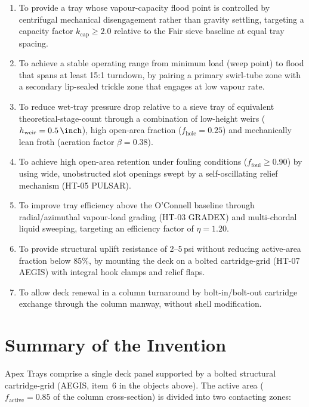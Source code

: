 \documentclass[11pt,letterpaper]{article}
\begin{document}
\begin{enumerate}[nosep]
  \item To provide a tray whose vapour-capacity flood point is controlled by
    centrifugal mechanical disengagement rather than gravity settling, targeting
    a capacity factor $k_{\mathrm{cap}}\geq 2.0$ relative to the Fair sieve
    baseline at equal tray spacing.
  \item To achieve a stable operating range from minimum load (weep point) to
    flood that spans at least 15:1 turndown, by pairing a primary swirl-tube
    zone with a secondary lip-sealed trickle zone that engages at low vapour
    rate.
  \item To reduce wet-tray pressure drop relative to a sieve tray of equivalent
    theoretical-stage-count through a combination of low-height weirs
    ($h_{\mathrm{weir}}=\SI{0.5}{\inch}$), high open-area fraction
    ($f_{\mathrm{hole}}=0.25$) and mechanically lean froth (aeration factor
    $\beta=0.38$).
  \item To achieve high open-area retention under fouling conditions
    ($f_{\mathrm{foul}}\geq 0.90$) by using wide, unobstructed slot openings
    swept by a self-oscillating relief mechanism (HT-05 PULSAR).
  \item To improve tray efficiency above the O'Connell baseline through
    radial/azimuthal vapour-load grading (HT-03 GRADEX) and multi-chordal
    liquid sweeping, targeting an efficiency factor of $\eta=1.20$.
  \item To provide structural uplift resistance of 2--5\,psi without
    reducing active-area fraction below 85\%, by mounting the deck on a
    bolted cartridge-grid (HT-07 AEGIS) with integral hook clamps and relief
    flaps.
  \item To allow deck renewal in a column turnaround by bolt-in/bolt-out
    cartridge exchange through the column manway, without shell modification.
\end{enumerate}

\section{Summary of the Invention}

Apex Trays comprise a single deck panel supported by a bolted structural
cartridge-grid (AEGIS, item~6 in the objects above).  The active area
($f_{\mathrm{active}}=0.85$ of the column cross-section) is divided into two
contacting zones:
\end{document}
